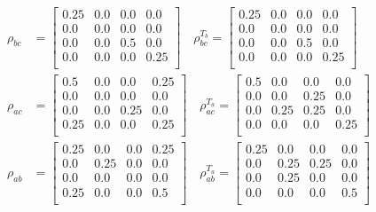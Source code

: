 \documentclass{scrartcl}
\begin{document}
        \begin{align*}
            \rho_{bc} &= 
            \left[
            \begin{array}{cccc}
            0.25 & 0.0 & 0.0 & 0.0 \\
            0.0 & 0.0 & 0.0 & 0.0 \\
            0.0 & 0.0 & 0.5 & 0.0 \\
            0.0 & 0.0 & 0.0 & 0.25 \\
            \end{array}
            \right] \quad \rho_{bc}^{T_b} = \left[
                \begin{array}{cccc}
                0.25 & 0.0 & 0.0 & 0.0 \\
                0.0 & 0.0 & 0.0 & 0.0 \\
                0.0 & 0.0 & 0.5 & 0.0 \\
                0.0 & 0.0 & 0.0 & 0.25 \\
                \end{array}
                \right]\\
            \rho_{ac} &=
            \left[
            \begin{array}{cccc}
            0.5 & 0.0 & 0.0 & 0.25 \\
            0.0 & 0.0 & 0.0 & 0.0 \\
            0.0 & 0.0 & 0.25 & 0.0 \\
            0.25 & 0.0 & 0.0 & 0.25 \\
            \end{array}
            \right] \quad \rho_{ac}^{T_a} = \left[
                \begin{array}{cccc}
                0.5 & 0.0 & 0.0 & 0.0 \\
                0.0 & 0.0 & 0.25 & 0.0 \\
                0.0 & 0.25 & 0.25 & 0.0 \\
                0.0 & 0.0 & 0.0 & 0.25 \\
                \end{array}
                \right]\\
            \rho_{ab} &=
            \left[
            \begin{array}{cccc}
            0.25 & 0.0 & 0.0 & 0.25 \\
            0.0 & 0.25 & 0.0 & 0.0 \\
            0.0 & 0.0 & 0.0 & 0.0 \\
            0.25 & 0.0 & 0.0 & 0.5 \\
            \end{array}
            \right]\quad \rho_{ab}^{T_a} = \left[
                \begin{array}{cccc}
                0.25 & 0.0 & 0.0 & 0.0 \\
                0.0 & 0.25 & 0.25 & 0.0 \\
                0.0 & 0.25 & 0.0 & 0.0 \\
                0.0 & 0.0 & 0.0 & 0.5 \\
                \end{array}
                \right]
            \end{align*}
\end{document}
